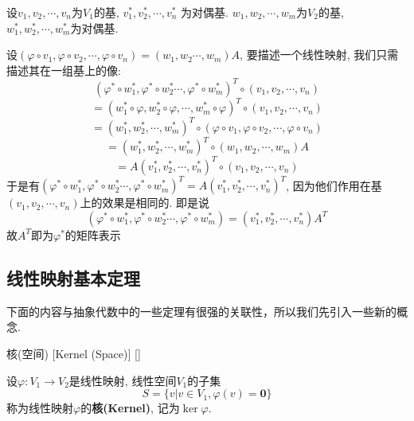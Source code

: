 \documentclass[UTF8]{ctexart}
\begin{document}
            \begin{prf}
                设$v_1,v_2,\cdots,v_n$为$V_1$的基, $v_1^*, v_2^*,\cdots,v_n^*$ 为对偶基. 
                $w_1,w_2,\cdots,w_m$为$V_2$的基, $w_1^*, w_2^*,\cdots, w_m^*$为对偶基. 
                
                设$(\varphi\circ v_1,\varphi\circ v_2,\cdots,\varphi\circ v_n)=(w_1,w_2\cdots,w_m)A$, 
                要描述一个线性映射, 我们只需描述其在一组基上的像:
                \[(\varphi^*\circ w_1^*,\varphi^*\circ w_2^*\cdots,\varphi^*\circ w_m^*)^T\circ(v_1,v_2,\cdots,v_n)\]
                \[=(w_1^*\circ\varphi,w_2^*\circ\varphi,\cdots,w_m^*\circ\varphi)^T\circ(v_1,v_2,\cdots,v_n)\]
                \[=(w_1^*,w_2^*,\cdots,w_m^*)^T\circ(\varphi\circ v_1,\varphi\circ v_2,\cdots,\varphi\circ v_n)\]
                \[=(w_1^*,w_2^*,\cdots,w_m^*)^T\circ(w_1,w_2,\cdots,w_m)A\]
                \[=A(v_1^*,v_2^*,\cdots,v_n^*)^T\circ(v_1,v_2,\cdots,v_n)\]
                于是有$(\varphi^*\circ w_1^*,\varphi^*\circ w_2^*\cdots,\varphi^*\circ w_m^*)^T=A(v_1^*,v_2^*,\cdots,v_n^*)^T$, 
                因为他们作用在基$(v_1,v_2,\cdots,v_n)$上的效果是相同的. 即是说
                \[(\varphi^*\circ w_1^*,\varphi^*\circ w_2^*\cdots,\varphi^*\circ w_m^*)=(v_1^*,v_2^*,\cdots,v_n^*)A^T\]
                故$A^T$即为$\varphi^*$的矩阵表示
            \end{prf}
            
        
		
	
	\subsection{线性映射基本定理}
	下面的内容与抽象代数中的一些定理有很强的关联性，所以我们先引入一些新的概念.
		\begin{dfn}
			[]
			{核(空间)}
			[Kernel (Space)]
			[]

			设$\varphi:V_1\to V_2$是线性映射, 线性空间$V_1$的子集$$S=\{v|v\in V_1,\varphi(v)=\mathbf{0}\}$$称为线性映射$\varphi$的\textbf{核(Kernel)}, 记为$\ker\varphi$. 
		\end{dfn}
  
\end{document}
